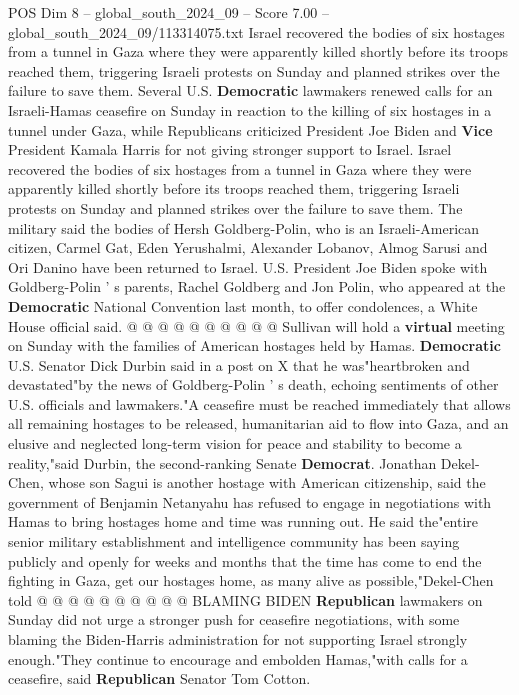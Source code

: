 \begin{textsample}{POS Dim 8 – global\_south\_2024\_09 – Score 7.00 – global\_south\_2024\_09/113314075.txt}  \label{ex:f8_pos_254}
Israel recovered the bodies of six hostages from a tunnel in Gaza where they were apparently killed shortly before its troops reached them, triggering Israeli protests on Sunday and planned strikes over the failure to save them.
Several U.S. \textbf{Democratic} lawmakers renewed calls for an Israeli-Hamas ceasefire on Sunday in reaction to the killing of six hostages in a tunnel under Gaza, while Republicans criticized President Joe Biden and \textbf{Vice} President Kamala Harris for not giving stronger support to Israel.
Israel recovered the bodies of six hostages from a tunnel in Gaza where they were apparently killed shortly before its troops reached them, triggering Israeli protests on Sunday and planned strikes over the failure to save them.
The military said the bodies of Hersh Goldberg-Polin, who is an Israeli-American citizen, Carmel Gat, Eden Yerushalmi, Alexander Lobanov, Almog Sarusi and Ori Danino have been returned to Israel.
U.S.
President Joe Biden spoke with Goldberg-Polin ' s parents, Rachel Goldberg and Jon Polin, who appeared at the \textbf{Democratic} National Convention last month, to offer condolences, a White House official said. @ @ @ @ @ @ @ @ @ @ Sullivan will hold a \textbf{virtual} meeting on Sunday with the families of American hostages held by Hamas. \textbf{Democratic} U.S.
Senator Dick Durbin said in a post on X that he was"heartbroken and devastated"by the news of Goldberg-Polin ' s death, echoing sentiments of other U.S. officials and lawmakers."A ceasefire must be reached immediately that allows all remaining hostages to be released, humanitarian aid to flow into Gaza, and an elusive and neglected long-term vision for peace and stability to become a reality,"said Durbin, the second-ranking Senate \textbf{Democrat}.
Jonathan Dekel-Chen, whose son Sagui is another hostage with American citizenship, said the government of Benjamin Netanyahu has refused to engage in negotiations with Hamas to bring hostages home and time was running out.
He said the"entire senior military establishment and intelligence community has been saying publicly and openly for weeks and months that the time has come to end the fighting in Gaza, get our hostages home, as many alive as possible,"Dekel-Chen told @ @ @ @ @ @ @ @ @ @ BLAMING BIDEN \textbf{Republican} lawmakers on Sunday did not urge a stronger push for ceasefire negotiations, with some blaming the Biden-Harris administration for not supporting Israel strongly enough."They continue to encourage and embolden Hamas,"with calls for a ceasefire, said \textbf{Republican} Senator Tom Cotton.

\end{textsample}

